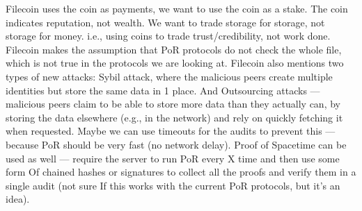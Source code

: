 
Filecoin uses the coin as payments, we want to use the coin as a stake.
The coin indicates reputation, not wealth.
We want to trade storage for storage, not storage for money.
i.e., using coins to trade trust/credibility, not work done.
Filecoin makes the assumption that PoR protocols do not check the whole file,
which is not true in the protocols we are looking at.
Filecoin also mentions two types of new attacks:
Sybil attack, where the malicious peers create multiple identities but store the same data in 1 place.
And Outsourcing attacks --- malicious peers claim to be able to store more data than they actually can,
by storing the data elsewhere (e.g., in the network) and rely on quickly fetching it when requested.
Maybe we can use timeouts for the audits to prevent this --- because PoR should be very fast (no network delay).
Proof of Spacetime can be used as well --- require the server to run PoR every X time and then use some form Of
chained hashes or signatures to collect all the proofs and verify them in a single audit (not sure If
this works with the current PoR protocols, but it's an idea).
